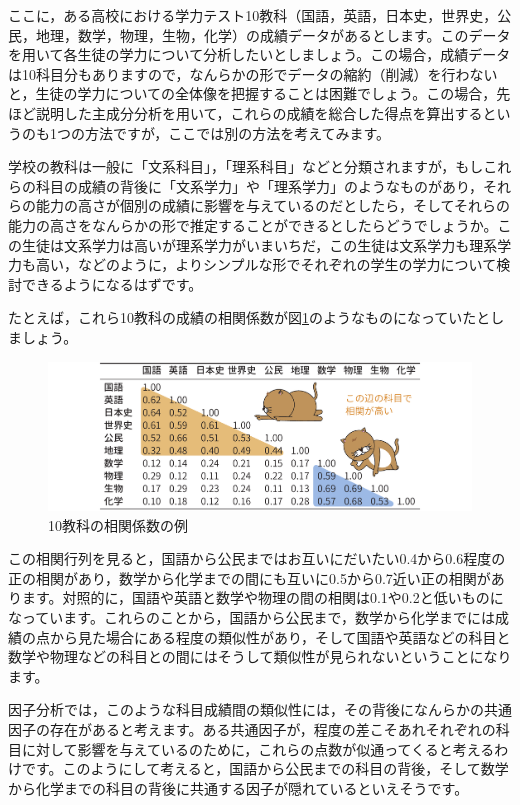 \documentclass[
  12pt,
  a5jpaper,
  lualatex, ja=standard]{bxjsbook}
\begin{document}
ここに，ある高校における学力テスト10教科（国語，英語，日本史，世界史，公民，地理，数学，物理，生物，化学）の成績データがあるとします。このデータを用いて各生徒の学力について分析したいとしましょう。この場合，成績データは10科目分もありますので，なんらかの形でデータの縮約（削減）を行わないと，生徒の学力についての全体像を把握することは困難でしょう。この場合，先ほど説明した主成分分析を用いて，これらの成績を総合した得点を算出するというのも1つの方法ですが，ここでは別の方法を考えてみます。

学校の教科は一般に「文系科目」，「理系科目」などと分類されますが，もしこれらの科目の成績の背後に「文系学力」や「理系学力」のようなものがあり，それらの能力の高さが個別の成績に影響を与えているのだとしたら，そしてそれらの能力の高さをなんらかの形で推定することができるとしたらどうでしょうか。この生徒は文系学力は高いが理系学力がいまいちだ，この生徒は文系学力も理系学力も高い，などのように，よりシンプルな形でそれぞれの学生の学力について検討できるようになるはずです。

たとえば，これら10教科の成績の相関係数が図\ref{fig:factor-efa-basics}のようなものになっていたとしましょう。

\begin{figure}[!ht]

{\centering \includegraphics[width=1\linewidth]{images/factor/efa-basics} 

}

\caption{10教科の相関係数の例}\label{fig:factor-efa-basics}
\end{figure}

この相関行列を見ると，国語から公民まではお互いにだいたい0.4から0.6程度の正の相関があり，数学から化学までの間にも互いに0.5から0.7近い正の相関があります。対照的に，国語や英語と数学や物理の間の相関は0.1や0.2と低いものになっています。これらのことから，国語から公民まで，数学から化学までには成績の点から見た場合にある程度の類似性があり，そして国語や英語などの科目と数学や物理などの科目との間にはそうして類似性が見られないということになります。

因子分析では，このような科目成績間の類似性には，その背後になんらかの共通因子の存在があると考えます。ある共通因子が，程度の差こそあれそれぞれの科目に対して影響を与えているのために，これらの点数が似通ってくると考えるわけです。このようにして考えると，国語から公民までの科目の背後，そして数学から化学までの科目の背後に共通する因子が隠れているといえそうです。
\end{document}
